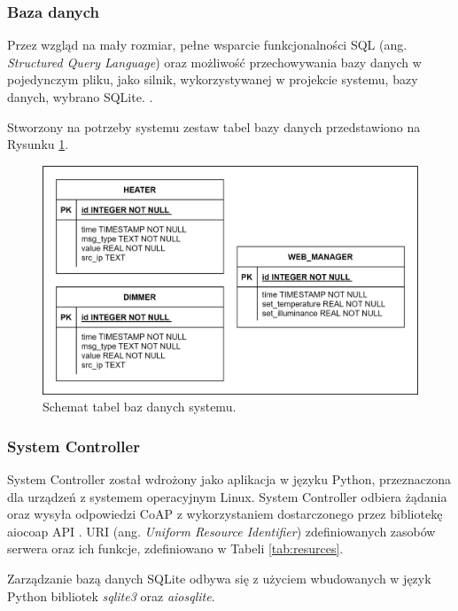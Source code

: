         \subsubsection{Baza danych}
            Przez wzgląd na mały rozmiar, pełne wsparcie funkcjonalności SQL (ang. \textit{Structured Query Language}) oraz możliwość przechowywania bazy danych w pojedynczym pliku, jako silnik, wykorzystywanej w projekcie systemu, bazy danych, wybrano SQLite. \cite{sqlite}.

            Stworzony na potrzeby systemu zestaw tabel bazy danych przedstawiono na Rysunku \ref{fig:db-diagram}.

            \begin{figure}[H]
                \centering
                \includegraphics[width=0.8\linewidth]{graphics/db_diagram.png}
                \caption{Schemat tabel baz danych systemu.}
                \label{fig:db-diagram}
            \end{figure}
    
        \subsubsection{System Controller}
    
            System Controller został wdrożony jako aplikacja w języku Python, przeznaczona dla urządzeń z systemem operacyjnym Linux.
            System Controller odbiera żądania oraz wysyła odpowiedzi CoAP z wykorzystaniem dostarczonego przez bibliotekę aiocoap API \cite{aiocoap}. URI (ang. \textit{Uniform Resource Identifier}) zdefiniowanych zasobów serwera oraz ich funkcje, zdefiniowano w Tabeli \ref{tab:resurces}.
            
            Zarządzanie bazą danych SQLite odbywa się z użyciem wbudowanych w język Python bibliotek \textit{sqlite3} oraz \textit{aiosqlite}.

